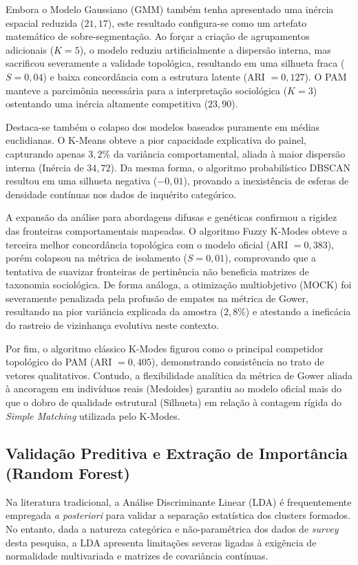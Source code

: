 \documentclass[12pt]{article}
\begin{document}
Embora o Modelo Gaussiano (GMM) também tenha apresentado uma inércia espacial reduzida ($21,17$), este resultado configura-se como um artefato matemático de sobre-segmentação. Ao forçar a criação de agrupamentos adicionais ($K=5$), o modelo reduziu artificialmente a dispersão interna, mas sacrificou severamente a validade topológica, resultando em uma silhueta fraca ($S = 0,04$) e baixa concordância com a estrutura latente (ARI $= 0,127$). O PAM manteve a parcimônia necessária para a interpretação sociológica ($K=3$) ostentando uma inércia altamente competitiva ($23,90$).

Destaca-se também o colapso dos modelos baseados puramente em médias euclidianas. O K-Means obteve a pior capacidade explicativa do painel, capturando apenas $3,2\%$ da variância comportamental, aliada à maior dispersão interna (Inércia de $34,72$). Da mesma forma, o algoritmo probabilístico DBSCAN resultou em uma silhueta negativa ($-0,01$), provando a inexistência de esferas de densidade contínuas nos dados de inquérito categórico.

A expansão da análise para abordagens difusas e genéticas confirmou a rigidez das fronteiras comportamentais mapeadas. O algoritmo Fuzzy K-Modes obteve a terceira melhor concordância topológica com o modelo oficial (ARI $= 0,383$), porém colapsou na métrica de isolamento ($S = 0,01$), comprovando que a tentativa de suavizar fronteiras de pertinência não beneficia matrizes de taxonomia sociológica. De forma análoga, a otimização multiobjetivo (MOCK) foi severamente penalizada pela profusão de empates na métrica de Gower, resultando na pior variância explicada da amostra ($2,8\%$) e atestando a ineficácia do rastreio de vizinhança evolutiva neste contexto.

Por fim, o algoritmo clássico K-Modes figurou como o principal competidor topológico do PAM (ARI $= 0,405$), demonstrando consistência no trato de vetores qualitativos. Contudo, a flexibilidade analítica da métrica de Gower aliada à ancoragem em indivíduos reais (Medoides) garantiu ao modelo oficial mais do que o dobro de qualidade estrutural (Silhueta) em relação à contagem rígida do \textit{Simple Matching} utilizada pelo K-Modes.

\subsection{Validação Preditiva e Extração de Importância (Random Forest)}

Na literatura tradicional, a Análise Discriminante Linear (LDA) é frequentemente empregada \textit{a posteriori} para validar a separação estatística dos clusters formados. No entanto, dada a natureza categórica e não-paramétrica dos dados de \textit{survey} desta pesquisa, a LDA apresenta limitações severas ligadas à exigência de normalidade multivariada e matrizes de covariância contínuas.
\end{document}
